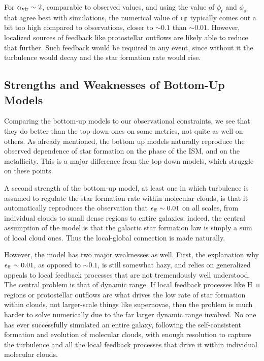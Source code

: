 For $\alpha_{\rm vir} \sim 2$, comparable to observed values, and using the value of $\phi_t$ and $\phi_s$ that agree best with simulations, the numerical value of $\epsilon_{\rm ff}$ typically comes out a bit too high compared to observations, closer to $\sim 0.1$ than $\sim 0.01$. However, localized sources of feedback like protostellar outflows are likely able to reduce that further. Such feedback would be required in any event, since without it the turbulence would decay and the star formation rate would rise.

\subsection{Strengths and Weaknesses of Bottom-Up Models}

Comparing the bottom-up models to our observational constraints, we see that they do better than the top-down ones on some metrics, not quite as well on others. As already mentioned, the bottom up models naturally reproduce the observed dependence of star formation on the phase of the ISM, and on the metallicity. This is a major difference from the top-down models, which struggle on these points.

A second strength of the bottom-up model, at least one in which turbulence is assumed to regulate the star formation rate within molecular clouds, is that it automatically reproduces the observation that $\epsilon_{\rm ff} \sim 0.01$ on all scales, from individual clouds to small dense regions to entire galaxies; indeed, the central assumption of the model is that the galactic star formation law is simply a sum of local cloud ones. Thus the local-global connection is made naturally.

However, the model has two major weaknesses as well. First, the explanation why $\epsilon_{\rm ff} \sim 0.01$, as opposed to $\sim 0.1$, is still somewhat hazy, and relies on generalized appeals to local feedback processes that are not tremendously well understood. The central problem is that of dynamic range. If local feedback processes like H~\textsc{ii} regions or protostellar outflows are what drives the low rate of star formation within clouds, not larger-scale things like supernovae, then the problem is much harder to solve numerically due to the far larger dynamic range involved. No one has ever successfully simulated an entire galaxy, following the self-consistent formation and evolution of molecular clouds, with enough resolution to capture the turbulence and all the local feedback processes that drive it within individual molecular clouds.

